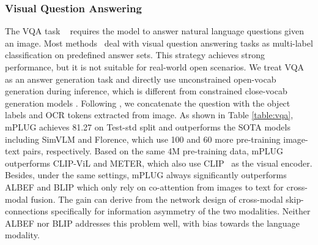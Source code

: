 \documentclass[11pt]{article}
\newcommand{\modelname}{mPLUG }
\begin{document}
\subsubsection{Visual Question Answering} \label{section:vqa_analysis} The VQA task ~\cite{antol2015vqa} requires the model to answer natural language questions given an image. Most methods~\cite{tan2019lxmert,wang2021vlmo,li2020oscar,wang2021simvlm} deal with visual question answering tasks as multi-label classification on predefined answer sets. This strategy achieves strong performance, but it is not suitable for real-world open scenarios. We treat VQA as an answer generation task and directly use unconstrained open-vocab generation during inference, which is different from constrained close-vocab generation models \cite{li2021align,wang2022OFA}. Following \cite{li2020oscar,wang2022OFA}, we concatenate the question with the object labels and OCR tokens extracted from image. As shown in Table \ref{table:vqa}, \modelname achieves 81.27 on Test-std split and outperforms the SOTA models including SimVLM and Florence, which use 100 and 60 more pre-training image-text pairs, respectively. Based on the same 4M pre-training data, \modelname outperforms CLIP-ViL and METER, which also use CLIP~\cite{radford2021learning} as the visual encoder. Besides, under the same settings, \modelname always significantly outperforms ALBEF and BLIP which only rely on co-attention from images to text for cross-modal fusion. The gain can derive from the network design of cross-modal skip-connections specifically for information asymmetry of the two modalities. Neither ALBEF nor BLIP addresses this problem well, with bias towards the language modality.
\end{document}
